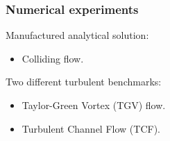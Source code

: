 \begin{frame}[t]
\frametitle{Numerical experiments}
\vfill
Manufactured analytical solution:
\begin{itemize}
\item Colliding flow.
\end{itemize}
\vspace{1cm}
Two different turbulent benchmarks:
\begin{itemize}
\item Taylor-Green Vortex (TGV) flow.
\item Turbulent Channel Flow (TCF).
\end{itemize}
\vfill
\end{frame}